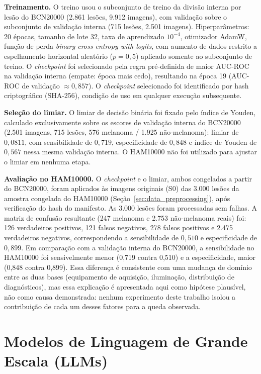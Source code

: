 \textbf{Treinamento.} O treino usou o subconjunto de treino da divisão interna por lesão do BCN20000 (2.861 lesões, 9.912 imagens), com validação sobre o subconjunto de validação interna (715 lesões, 2.501 imagens). Hiperparâmetros: 20 épocas, tamanho de lote 32, taxa de aprendizado $10^{-4}$, otimizador AdamW, função de perda \textit{binary cross-entropy with logits}, com aumento de dados restrito a espelhamento horizontal aleatório ($p=0{,}5$) aplicado somente ao subconjunto de treino. O \textit{checkpoint} foi selecionado pela regra pré-definida de maior AUC-ROC na validação interna (empate: época mais cedo), resultando na época 19 (AUC-ROC de validação $\approx 0{,}857$). O \textit{checkpoint} selecionado foi identificado por hash criptográfico (SHA-256), condição de uso em qualquer execução subsequente.

\textbf{Seleção do limiar.} O limiar de decisão binária foi fixado pelo índice de Youden, calculado exclusivamente sobre os escores de validação interna do BCN20000 (2.501 imagens, 715 lesões, 576 melanoma / 1.925 não-melanoma): limiar de $0{,}0811$, com sensibilidade de $0{,}719$, especificidade de $0{,}848$ e índice de Youden de $0{,}567$ nessa mesma validação interna. O HAM10000 não foi utilizado para ajustar o limiar em nenhuma etapa.

\textbf{Avaliação no HAM10000.} O \textit{checkpoint} e o limiar, ambos congelados a partir do BCN20000, foram aplicados às imagens originais (S0) das 3.000 lesões da amostra congelada do HAM10000 (Seção~\ref{sec:data_preprocessing}), após verificação do hash do manifesto. As 3.000 lesões foram processadas sem falhas. A matriz de confusão resultante (247 melanoma e 2.753 não-melanoma reais) foi: 126 verdadeiros positivos, 121 falsos negativos, 278 falsos positivos e 2.475 verdadeiros negativos, correspondendo a sensibilidade de $0{,}510$ e especificidade de $0{,}899$. Em comparação com a validação interna do BCN20000, a sensibilidade no HAM10000 foi sensivelmente menor (0,719 contra 0,510) e a especificidade, maior (0,848 contra 0,899). Essa diferença é consistente com uma mudança de domínio entre as duas bases (equipamento de aquisição, iluminação, distribuição de diagnósticos), mas essa explicação é apresentada aqui como hipótese plausível, não como causa demonstrada: nenhum experimento deste trabalho isolou a contribuição de cada um desses fatores para a queda observada.

\section{Modelos de Linguagem de Grande Escala (LLMs)}
\label{sec:llms}

